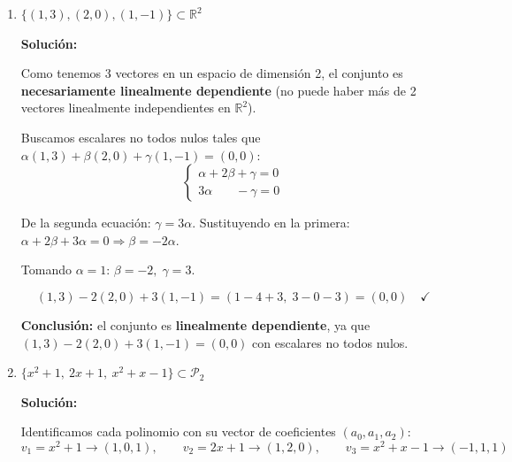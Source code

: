 \documentclass[12pt]{article}
\newcommand{\solucion}{%
    \vspace{0.8em}%
    \textbf{Solución:}%
    \vspace{0.8em}%
}
\begin{document}
\begin{enumerate}[label=\alph*.-]
    De la cuarta ecuación: $\beta=-1$. Sustituyendo en la primera: $\alpha=2$.

    Verificamos: en la segunda, $3(2)-(-1)=7$ \checkmark; en la tercera, $-2+(-1)=-3$ \checkmark.

    \textbf{Conclusión:} el conjunto es \textbf{linealmente dependiente}, pues $\begin{pmatrix}1&7\\-3&-5\end{pmatrix}=2\begin{pmatrix}1&3\\-1&0\end{pmatrix}-\begin{pmatrix}1&-1\\1&5\end{pmatrix}$.

    \item $\{(1,3),(2,0),(1,-1)\} \subset \mathbb{R}^2$

    \solucion

    Como tenemos 3 vectores en un espacio de dimensión 2, el conjunto es \textbf{necesariamente linealmente dependiente} (no puede haber más de 2 vectores linealmente independientes en $\mathbb{R}^2$).

    Buscamos escalares no todos nulos tales que $\alpha(1,3)+\beta(2,0)+\gamma(1,-1)=(0,0)$:
    \[
    \begin{cases}
    \alpha+2\beta+\gamma=0 \\
    3\alpha \phantom{+2\beta} -\gamma=0
    \end{cases}
    \]

    De la segunda ecuación: $\gamma=3\alpha$. Sustituyendo en la primera: $\alpha+2\beta+3\alpha=0 \Rightarrow \beta=-2\alpha$.

    Tomando $\alpha=1$: $\beta=-2,\;\gamma=3$.

    \[
    (1,3)-2(2,0)+3(1,-1) = (1-4+3,\; 3-0-3) = (0,0) \quad \checkmark
    \]

    \textbf{Conclusión:} el conjunto es \textbf{linealmente dependiente}, ya que $(1,3)-2(2,0)+3(1,-1)=(0,0)$ con escalares no todos nulos.

    \item $\{x^2 + 1,\ 2x + 1,\ x^2 + x - 1\} \subset \mathcal{P}_2$

    \solucion

    Identificamos cada polinomio con su vector de coeficientes $(a_0,a_1,a_2)$:
    \[
    v_1 = x^2+1 \to (1,0,1), \qquad v_2 = 2x+1 \to (1,2,0), \qquad v_3 = x^2+x-1 \to (-1,1,1)
    \]


\end{enumerate}
\end{document}
